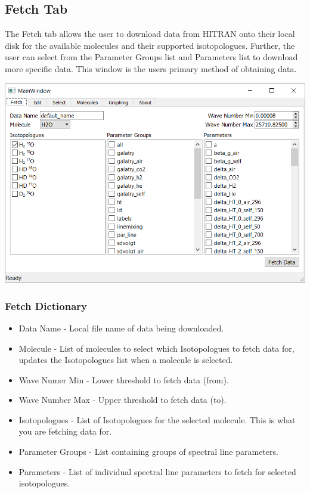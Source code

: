 \documentclass[12pt]{article}
\begin{document}
\subsection{Fetch Tab}
The Fetch tab allows the user to download data from HITRAN onto their local disk for the available molecules and their supported isotopologues. Further, the user can select from the Parameter Groups list and Parameters list to download more specific data. This window is the users primary method of obtaining data.
\begin{center}
\includegraphics[scale = 0.6]{MainWindow_Fetch}
\end{center}
\subsubsection{Fetch Dictionary}
\begin{itemize}
\item Data Name - Local file name of data being downloaded.
\item Molecule - List of molecules to select which Isotopologues to fetch data for, updates the Isotopologues list when a molecule is selected.
\item Wave Numer Min - Lower threshold to fetch data (from).
\item Wave Number Max - Upper threshold to fetch data (to).
\item Isotopologues - List of Isotopologues for the selected molecule. This is what you are fetching data for.
\item Parameter Groups - List containing groups of spectral line parameters.
\item Parameters - List of individual spectral line parameters to fetch for selected isotopologues.
\end{itemize}
\end{document}
